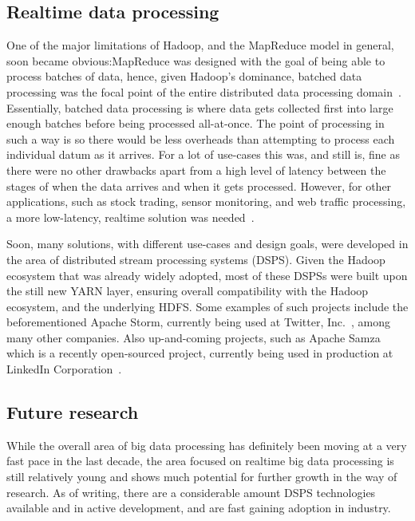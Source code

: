 \documentclass[a4paper,11pt]{article}
\begin{document}

\subsection{Realtime data processing} %
\label{sub:realtime_data_processing}

One of the major limitations of Hadoop, and the MapReduce model in general, soon became obvious:\@ MapReduce was designed
with the goal of being able to process batches of data, hence, given Hadoop's dominance, batched data processing was the
focal point of the entire distributed data processing domain~\cite{kamburugamuve_survey_2014}. Essentially, batched data
processing is where data gets collected first into large enough batches before being processed all-at-once. The point of
processing in such a way is so there would be less overheads than attempting to process each individual datum as it
arrives. For a lot of use-cases this was, and still is, fine as there were no other drawbacks apart from a high level of
latency between the stages of when the data arrives and when it gets processed. However, for other applications, such as
stock trading, sensor monitoring, and web traffic processing, a more low-latency, realtime solution was
needed~\cite{kamburugamuve_survey_2014}.

Soon, many solutions, with different use-cases and design goals, were developed in the area of distributed stream
processing systems (DSPS). Given the Hadoop ecosystem that was already widely adopted, most of these DSPSs were built
upon the still new YARN layer, ensuring overall compatibility with the Hadoop ecosystem, and the underlying HDFS. Some
examples of such projects include the beforementioned Apache Storm, currently being used at Twitter,
Inc.~\cite{toshniwal_stormtwitter_2014}, among many other companies. Also up-and-coming projects, such as Apache Samza
which is a recently open-sourced project, currently being used in production at LinkedIn Corporation~\cite{web:Samza}.


\subsection{Future research} %
\label{sub:the_future}

While the overall area of big data processing has definitely been moving at a very fast pace in the last decade, the
area focused on realtime big data processing is still relatively young and shows much potential for further growth in
the way of research. As of writing, there are a considerable amount DSPS technologies available and in active
development, and are fast gaining adoption in industry.
\end{document}
